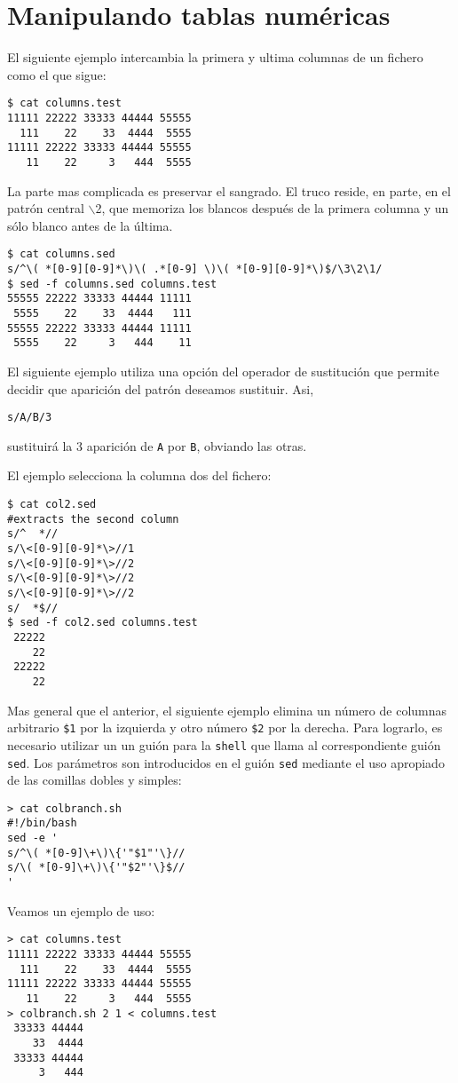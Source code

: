 \section{Manipulando tablas numéricas}
El siguiente ejemplo intercambia la primera y ultima columnas
de un fichero como el que sigue:
\begin{verbatim}
$ cat columns.test
11111 22222 33333 44444 55555
  111    22    33  4444  5555
11111 22222 33333 44444 55555
   11    22     3   444  5555
\end{verbatim}
La parte mas complicada es preservar el sangrado.
El truco reside, en parte, en el patrón central $\backslash$2, que 
memoriza los blancos después de la primera columna y un sólo blanco 
antes de la última.
\begin{verbatim}
$ cat columns.sed
s/^\( *[0-9][0-9]*\)\( .*[0-9] \)\( *[0-9][0-9]*\)$/\3\2\1/
$ sed -f columns.sed columns.test
55555 22222 33333 44444 11111
 5555    22    33  4444   111
55555 22222 33333 44444 11111
 5555    22     3   444    11  
\end{verbatim}
El siguiente ejemplo utiliza
una opción del operador de sustitución que permite decidir que aparición
del patrón deseamos sustituir. Asi,

\verb|s/A/B/3|

sustituirá la 3 aparición de \verb|A| por \verb|B|, obviando las otras.

El ejemplo selecciona la columna dos del fichero:
\begin{verbatim}
$ cat col2.sed
#extracts the second column
s/^  *//
s/\<[0-9][0-9]*\>//1
s/\<[0-9][0-9]*\>//2
s/\<[0-9][0-9]*\>//2
s/\<[0-9][0-9]*\>//2
s/  *$//
$ sed -f col2.sed columns.test
 22222
    22
 22222
    22                
\end{verbatim}
Mas general que el anterior, el siguiente ejemplo elimina 
un número de columnas arbitrario \verb|$1| por la izquierda y otro 
número \verb|$2| por la derecha.
Para lograrlo, es necesario utilizar un un guión para la \verb|shell| 
que llama al correspondiente guión \verb|sed|. Los parámetros 
son introducidos en el guión \verb|sed| mediante el uso apropiado
de las comillas dobles y simples:

\begin{verbatim}
> cat colbranch.sh
#!/bin/bash
sed -e '
s/^\( *[0-9]\+\)\{'"$1"'\}//
s/\( *[0-9]\+\)\{'"$2"'\}$//
'
\end{verbatim}
Veamos un ejemplo de uso:
\begin{verbatim}
> cat columns.test
11111 22222 33333 44444 55555
  111    22    33  4444  5555
11111 22222 33333 44444 55555
   11    22     3   444  5555
> colbranch.sh 2 1 < columns.test
 33333 44444
    33  4444
 33333 44444
     3   444
\end{verbatim}


